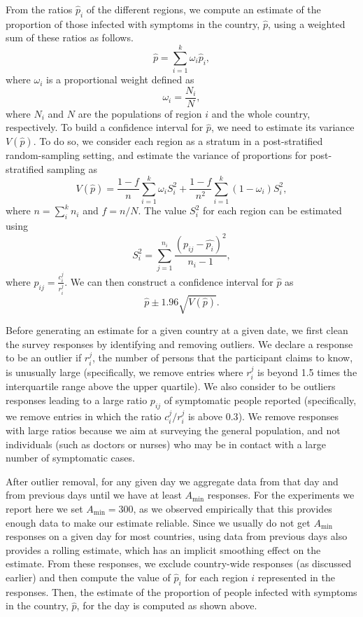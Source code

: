 \documentclass[sigconf,authordraft]{acmart}
\begin{document}
From the ratios $\hat{p}_i$ of the different regions, we compute an estimate of the proportion of those infected with symptoms in the country, $\hat{p}$, using a weighted sum of these ratios as follows.
$$
\hat{p} = \sum_{i=1}^k \omega_i \hat{p}_i,
$$
where $\omega_i$ is a proportional weight defined as 
$$
\omega_i = \frac{N_i}{N},
$$ 
where $N_i$ and $N$ are the populations of region $i$ and the whole country, respectively.  To build a confidence interval for $\hat{p}$, we need to estimate its variance  $V\left( \hat{p} \right)$. To do so, we consider each region as a stratum in a post-stratified random-sampling setting, and estimate the variance of proportions for post-stratified sampling \cite{Holt1979} as 
$$
V\left( \hat{p} \right) = \frac{1-f}{n} \sum_{i=1}^k \omega_iS_i^2 + \frac{1-f}{n^2} \sum_{i=1}^k (1-\omega_i)S_i^2,$$ 
where $n = \sum_i^k n_i$ and $f = n/N$. The value $S_i^2$ for each region can be estimated using
$$S_i^2= \sum_{j=1}^{n_i} \frac{(p_{ij}-\hat{p_i})^2 }{n_i-1},$$
where $p_{ij} =  \frac{c_{i}^j}{r_i^j}$. We can then construct a confidence interval for $\hat{p}$ as
$$\hat{p} \pm 1.96 \sqrt{V(\hat{p})}.$$

Before generating an estimate for a given country at a given date, we first clean the survey responses by identifying and removing outliers. We declare a response to be an outlier if  $r_i^j$, the number of persons that the participant claims to know, is unusually large (specifically, we remove entries where  $r_i^j$ is beyond 1.5 times the interquartile range above the upper quartile). We also consider to be outliers responses leading to a large ratio $p_{ij}$ of symptomatic people reported (specifically, we remove entries in which the ratio $c_{i}^j/r_i^j$ is above $0.3$). We remove responses with large ratios because we aim at surveying the general population, and not individuals (such as doctors or nurses) who may be in contact with a large number of symptomatic cases. 

After outlier removal, for any given day we aggregate data from that day and from previous days until we have at least $A_{\min}$ responses. For the experiments we report here we set $A_{\min} = 300$, as we observed  empirically that this provides enough data to make our estimate reliable. Since we usually do not get $A_{\min}$ responses on a given day for most countries, using data from previous days also provides a rolling estimate, which has an implicit smoothing effect on the estimate. From these responses, we exclude country-wide responses (as discussed earlier) and then compute the value of $\hat{p}_i$ for each region $i$ represented in the responses. Then, the estimate of the proportion of people infected with symptoms in the country, $\hat{p}$, for the day is computed as shown above. 
\end{document}

